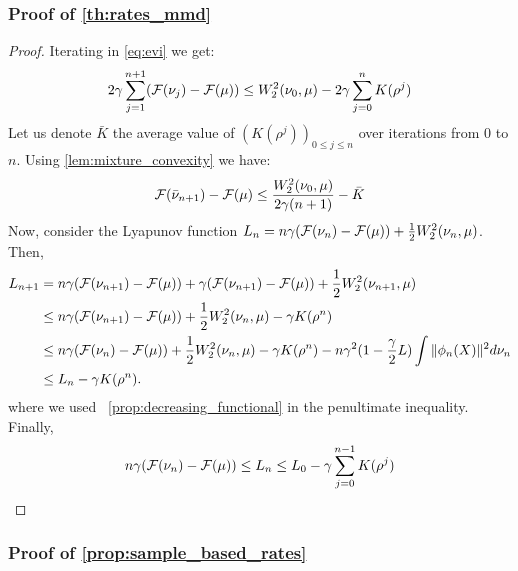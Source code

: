 \subsubsection{Proof of \cref{th:rates_mmd}}

\begin{proof}
	Iterating in \cref{eq:evi} we get:
	\begin{align}
	2\gamma \sum_{j=1}^{n+1} ({{\mathcal F}}(\nu_{j}) - {{\mathcal F}}(\mu)) \leq W_2^2(\nu_0,\mu) - 2\gamma \sum_{j=0}^n K(\rho^j)
	\end{align}
	Let us denote $\bar{K}$ the average value of $(K(\rho^j))_{0\leq j \leq n}$ over iterations from $0$ to $n$. Using \cref{lem:mixture_convexity} we have:
	\begin{align}
	{{\mathcal F}}(\bar{\nu}_{n+1})-{{\mathcal F}}(\mu)\leq  \frac{W_2^2(\nu_0,\mu)}{2 \gamma (n+1)} -\bar{K}
	\end{align}
	Now, consider the Lyapunov function $L_n = n \gamma ({{\mathcal F}}(\nu_n) - {{\mathcal F}}(\mu)) + \frac12 W_2^2(\nu_n,\mu)$. Then,
	\begin{align*}
	L_{n+1} &= n\gamma({{\mathcal F}}(\nu_{n+1}) - {{\mathcal F}}(\mu)) + \gamma({{\mathcal F}}(\nu_{n+1}) - {{\mathcal F}}(\mu)) + \frac12 W_2^2(\nu_{n+1},\mu)\\
	&\leq n\gamma({{\mathcal F}}(\nu_{n+1}) - {{\mathcal F}}(\mu)) + \frac12 W_2^2(\nu_n,\mu)-\gamma K(\rho^n)\\
	&\leq n\gamma({{\mathcal F}}(\nu_{n}) - {{\mathcal F}}(\mu)) + \frac12 W_2^2(\nu_n,\mu)-\gamma K(\rho^n) -n\gamma^2 (1-\frac{\gamma}{2}L )\int \Vert \phi_n(X)\Vert^2 d\nu_n \\
	&\leq  L_n - \gamma K(\rho^n).
	\end{align*}
	where we used ~\cref{prop:decreasing_functional} in the penultimate inequality.
	Finally, 
	\begin{equation}
	n\gamma ({{\mathcal F}}(\nu_{n}) - {{\mathcal F}}(\mu)) \leq L_n \leq L_0 -\gamma \sum_{j = 0}^{n-1} K(\rho^j)
	\end{equation}
\end{proof}

\subsubsection{Proof of \cref{prop:sample_based_rates}}

